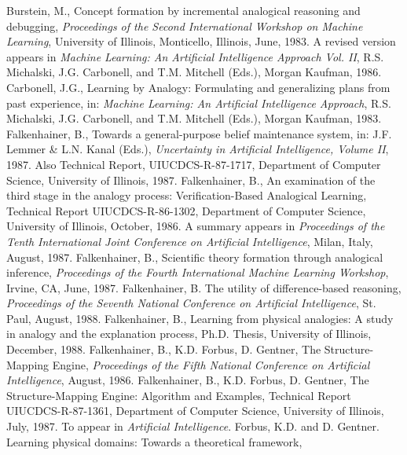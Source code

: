\begin{thebibliography}{99}

Burstein, M., Concept formation by incremental analogical reasoning and
debugging, {\it Proceedings of the Second International Workshop on
Machine Learning}, University of Illinois, Monticello, Illinois, June,
1983.  A revised version appears in {\it Machine Learning: An Artificial
Intelligence Approach Vol. II}, R.S. Michalski, J.G. Carbonell, and T.M.
Mitchell (Eds.), Morgan Kaufman, 1986.
Carbonell, J.G., Learning by Analogy: Formulating and generalizing plans
from past experience, in: {\it Machine Learning: An Artificial
Intelligence Approach}, R.S. Michalski, J.G. Carbonell, and T.M.
Mitchell (Eds.), Morgan Kaufman, 1983.
Falkenhainer, B.,
Towards a general-purpose belief maintenance system, in: J.F. Lemmer \& L.N.
Kanal (Eds.), {\it Uncertainty in Artificial Intelligence, Volume II}, 1987.
Also Technical Report, UIUCDCS-R-87-1717, Department of Computer Science,
University of Illinois, 1987.
Falkenhainer, B.,
An examination of the third stage in the analogy process:
Verification-Based Analogical Learning, Technical Report
UIUCDCS-R-86-1302, Department of Computer Science, University of Illinois,
October, 1986. A summary appears in {\it Proceedings of the Tenth
International Joint Conference on Artificial Intelligence}, Milan, Italy,
August, 1987.
Falkenhainer, B.,
Scientific theory formation through analogical inference, {\it
Proceedings of the Fourth International Machine Learning Workshop}, Irvine,
CA, June, 1987.
Falkenhainer, B.
The utility of difference-based reasoning, {\it Proceedings of the Seventh
National Conference on Artificial Intelligence}, St. Paul, August, 1988.
Falkenhainer, B., Learning from physical analogies: A study in analogy
and the explanation process, Ph.D. Thesis, University of Illinois,
December, 1988.
Falkenhainer, B., K.D. Forbus, D. Gentner,
The Structure-Mapping Engine, {\it Proceedings of the Fifth National
Conference on Artificial Intelligence}, August, 1986.
Falkenhainer, B., K.D. Forbus, D. Gentner,
The Structure-Mapping Engine:  Algorithm and Examples, Technical Report
UIUCDCS-R-87-1361, Department of Computer Science, University of Illinois,
July, 1987. To appear in {\it Artificial Intelligence}.
Forbus, K.D. and D. Gentner.
Learning physical domains: Towards a theoretical framework,

\end{thebibliography}
